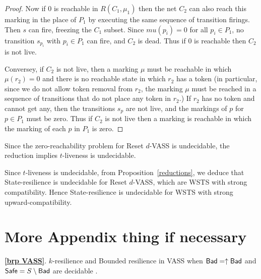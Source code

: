 \begin{proof}
Now if $0$ is reachable
in $R(C_1, \mu_1)$ 
then the net $C_2$ can also reach this marking
in the place of $P_1$ by executing the same sequence of transition firings.
Then $s$ can fire, freezing the $C_1$ subset.
Since $mu(p_i) = 0$ for all $p_i \in P_1$, no transition $s_{p_i}$ with $p_i \in P_1$ can fire, and $C_2$ is dead.
Thus if $0$ is reachable then $C_2$ is not live.

Conversey, if $C_2$ is not live, then a marking $\mu$ must be reachable in which 
$\mu(r_2) = 0$ and there is no reachable state in which $r_2$ has a token
(in particular, since we do not allow token removal from $r_2$, the marking $\mu$ must be reached in a sequence of transitions that do not place any token in $r_2$.)
If $r_2$ has no token and cannot get any, then the transitions $s_p$ are not live, and the markings of $p$ for $p \in P_1$ must be zero. 
Thus if $C_2$ is not live then a marking is reachable in which the marking of each $p$ in $P_1$ is zero. 
\end{proof}


Since the zero-reachability problem for Reset $d$-VASS is undecidable, the reduction implies 
%
%
{\sc %
$t$-liveness} is undecidable.

Since {\sc $t$-liveness} is undecidable, from Proposition~\ref{reductions},  we deduce that {\sc State-resilience} is undecidable  for Reset $d$-VASS, which are WSTS with strong compatibility. Hence {\sc State-resilience} is undecidable  for WSTS with strong upward-compatibility. %



\section{More Appendix thing if necessary}\label{appendix brp VASS}

\begin{theorem*}{\textbf{\ref{brp VASS}}.}
{\sc $k$-resilience }  and {\sc Bounded resilience} in VASS when $\textsf{Bad} = \uparrow \textsf{Bad}$ and $\textsf{Safe} = S \setminus \textsf{Bad}$ are decidable%
.
\end{theorem*}

